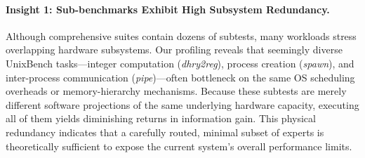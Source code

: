\documentclass[sigplan,10pt]{acmart}
\newcommand{\id}[1]{{\itshape #1}}
\begin{document}

\paragraph{Insight 1: Sub-benchmarks Exhibit High Subsystem Redundancy.}
\label{subsec:motivation-redundancy}
Although comprehensive suites contain dozens of subtests, many workloads stress overlapping hardware subsystems. Our profiling reveals that seemingly diverse UnixBench tasks---integer computation (\id{dhry2reg}), process creation (\id{spawn}), and inter-process communication (\id{pipe})---often bottleneck on the same OS scheduling overheads or memory-hierarchy mechanisms. Because these subtests are merely different software projections of the same underlying hardware capacity, executing all of them yields diminishing returns in information gain. This physical redundancy indicates that a carefully routed, minimal subset of experts is theoretically sufficient to expose the current system's overall performance limits.
\end{document}
